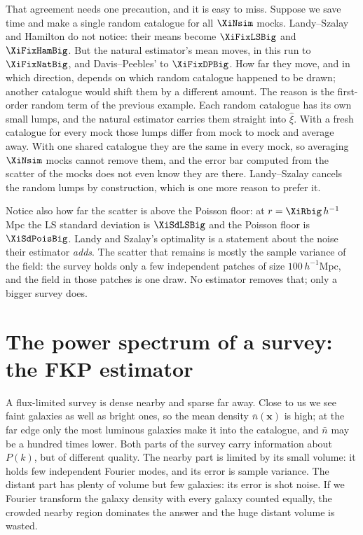 That agreement needs one precaution, and it is easy to miss. Suppose we save time and
make a single random catalogue for all $\XiNsim$ mocks. Landy--Szalay and Hamilton do not
notice: their means become $\XiFixLSBig$ and $\XiFixHamBig$. But the natural estimator's
mean moves, in this run to $\XiFixNatBig$, and Davis--Peebles' to $\XiFixDPBig$. How
far they move, and in which direction, depends on which random catalogue happened to
be drawn; another catalogue would shift them by a different amount. The reason is the first-order random term of the previous example. Each random
catalogue has its own small lumps, and the natural estimator carries them straight into
$\hat\xi$. With a fresh catalogue for every mock those lumps differ from mock to mock
and average away. With one shared catalogue they are the same in every mock, so
averaging $\XiNsim$ mocks cannot remove them, and the error bar computed from the
scatter of the mocks does not even know they are there. Landy--Szalay cancels the
random lumps by construction, which is one more reason to prefer it.

Notice also how far the scatter is above the Poisson floor: at
$r=\XiRbig\,h^{-1}$Mpc the LS standard deviation is $\XiSdLSBig$ and the Poisson
floor is $\XiSdPoisBig$. Landy and Szalay's optimality is a statement about the
noise their estimator \emph{adds}. The scatter that remains is mostly the sample
variance of the field: the survey holds only a few independent patches of size
$100\,h^{-1}$Mpc, and the field in those patches is one draw. No estimator removes
that; only a bigger survey does.
\section{The power spectrum of a survey: the FKP estimator}
\label{11a:sec:fkp}

A flux-limited survey is dense nearby and sparse far away. Close to us we see
faint galaxies as well as bright ones, so the mean density $\bar n(\bm x)$ is high;
at the far edge only the most luminous galaxies make it into the catalogue, and
$\bar n$ may be a hundred times lower. Both parts of the survey carry information
about $P(k)$, but of different quality. The nearby part is limited by its small
volume: it holds few independent Fourier modes, and its error is sample variance.
The distant part has plenty of volume but few galaxies: its error is shot noise.
If we Fourier transform the galaxy density with every galaxy counted equally, the
crowded nearby region dominates the answer and the huge distant volume is wasted.

